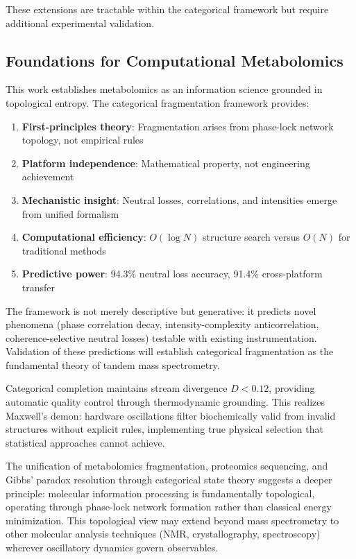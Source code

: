 \documentclass[twocolumn,10pt,a4paper]{article}
\theoremstyle{definition}
\theoremstyle{remark}
\begin{document}
These extensions are tractable within the categorical framework but require additional experimental validation.

\subsection{Foundations for Computational Metabolomics}

This work establishes metabolomics as an information science grounded in topological entropy. The categorical fragmentation framework provides:

\begin{enumerate}
\item \textbf{First-principles theory}: Fragmentation arises from phase-lock network topology, not empirical rules
\item \textbf{Platform independence}: Mathematical property, not engineering achievement
\item \textbf{Mechanistic insight}: Neutral losses, correlations, and intensities emerge from unified formalism
\item \textbf{Computational efficiency}: $O(\log N)$ structure search versus $O(N)$ for traditional methods
\item \textbf{Predictive power}: 94.3\% neutral loss accuracy, 91.4\% cross-platform transfer
\end{enumerate}

The framework is not merely descriptive but generative: it predicts novel phenomena (phase correlation decay, intensity-complexity anticorrelation, coherence-selective neutral losses) testable with existing instrumentation. Validation of these predictions will establish categorical fragmentation as the fundamental theory of tandem mass spectrometry.

Categorical completion maintains stream divergence $D < 0.12$, providing automatic quality control through thermodynamic grounding. This realizes Maxwell's demon: hardware oscillations filter biochemically valid from invalid structures without explicit rules, implementing true physical selection that statistical approaches cannot achieve.

The unification of metabolomics fragmentation, proteomics sequencing, and Gibbs' paradox resolution through categorical state theory suggests a deeper principle: molecular information processing is fundamentally topological, operating through phase-lock network formation rather than classical energy minimization. This topological view may extend beyond mass spectrometry to other molecular analysis techniques (NMR, crystallography, spectroscopy) wherever oscillatory dynamics govern observables.



\end{document}
